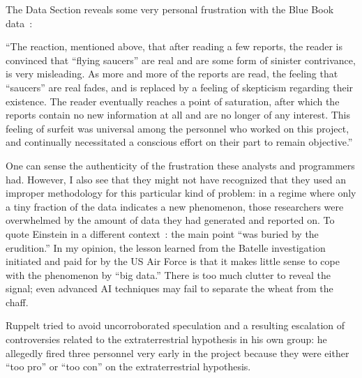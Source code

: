 The Data Section reveals some very personal frustration with the Blue Book data~\cite[p.~93]{ATIC1955May-SR14}:
\begin{svgraybox}
``The reaction, mentioned above, that after reading a few reports, the
reader is convinced that ``flying saucers'' are real and are some form of
sinister contrivance, is very misleading. As more and more of the reports
are read, the feeling that ``saucers'' are real fades, and is replaced by a
feeling of skepticism regarding their existence. The reader eventually
reaches a point of saturation, after which the reports contain no new information
at all and are no longer of any interest. This feeling of surfeit was
universal among the personnel who worked on this project, and continually
necessitated a conscious effort on their part to remain objective.''
\end{svgraybox}

One can sense the authenticity of the frustration these analysts and programmers had. However, I also see that they might not have recognized
that they used an improper methodology for this particular kind of problem:
in a regime where only a tiny fraction of the data indicates a new phenomenon,
those researchers were overwhelmed by the amount of data they had generated and reported on.
To quote Einstein in a different context~\cite{einstei-letter-to-schr,Meyenn-2011,Howard1985171,Howard1990}: the main point ``was buried by the erudition.''
In my opinion, the lesson learned from the Batelle investigation initiated and paid for by the US Air Force is that it makes little sense to cope with the phenomenon by ``big data.'' There is too much clutter to reveal the signal; even advanced AI techniques may fail to separate the wheat from the chaff.

Ruppelt tried to avoid uncorroborated speculation and a resulting escalation of controversies related to the extraterrestrial hypothesis in his own group: he allegedly fired three personnel very early in the project because they were either ``too pro'' or ``too con'' on the extraterrestrial hypothesis.


